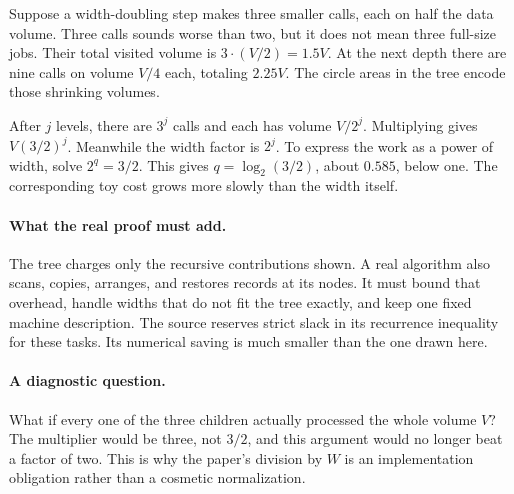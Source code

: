 
Suppose a width-doubling step makes three smaller calls, each on half the
data volume. Three calls sounds worse than two, but it does not mean three
full-size jobs. Their total visited volume is $3\cdot(V/2)=1.5V$.
At the next depth there are nine calls on volume $V/4$ each, totaling
$2.25V$. The circle areas in the tree encode those shrinking volumes.


After $j$ levels, there are $3^j$ calls and each has volume $V/2^j$.
Multiplying gives $V(3/2)^j$. Meanwhile the width factor is $2^j$.
To express the work as a power of width, solve $2^q=3/2$. This gives
$q=\log_2(3/2)$, about $0.585$, below one. The corresponding toy cost
grows more slowly than the width itself.

\paragraph{What the real proof must add.}
The tree charges only the recursive contributions shown. A real algorithm
also scans, copies, arranges, and restores records at its nodes. It must bound
that overhead, handle widths that do not fit the tree exactly, and keep one
fixed machine description. The source reserves strict slack in its recurrence
inequality for these tasks. Its numerical saving is much smaller than the
one drawn here.

\paragraph{A diagnostic question.}
What if every one of the three children actually processed the whole volume
$V$? The multiplier would be three, not $3/2$, and this argument would no
longer beat a factor of two. This is why the paper's division by $W$ is an
implementation obligation rather than a cosmetic normalization.

